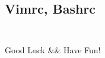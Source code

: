 \documentclass[titlepage, a4paper]{article}
\begin{document}
\begin{multicols}{2}
\begin{spacing}{0.6}
				\subsection*{Vimrc, Bashrc}
				\inputminted{vim}{src/Miscellany/vimrc}
				\inputminted{sh}{src/Miscellany/bashrc}
					
					
		\begin{comment}
				\newpage
			\subsection*{Java Example}
				\inputminted{java}{src/Miscellany/Main2.java}
			\subsection*{Python Example}
				\inputminted{python}{src/Miscellany/test.py}
			\subsection*{Blossom}
				\inputminted{python}{src/TreeandGraph/Blossom.cpp}
			\subsection*{Chu-liu}
				\inputminted{cpp}{src/TreeandGraph/最小树形图.cpp}
			\subsection*{天动万象}
				\inputminted{cpp}{src/yzh/ByteCampA3.cpp}
		\end{comment}
		\end{spacing}
		\endgroup
	\end{multicols}
	\begin{center}
		\LARGE{Good Luck \&\& Have Fun!}
	\end{center}
	
\end{document}
